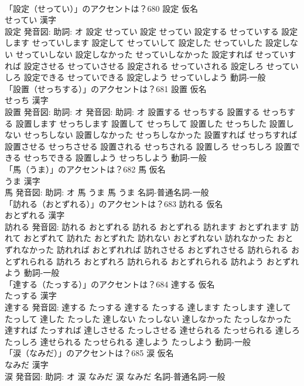 \documentclass[8pt]{extreport}
\begin{document}
\begin{CJK}{UTF8}{min}
\\	「設定（せってい）」のアクセントは？680	設定 仮名　
\\	せってい 漢字　
\\	設定 発音図: 助詞: オ	設定 せってい		設定 せってい 設定する せっていする 設定します せっていします 設定して せっていして 設定した せっていした 設定しない せっていしない 設定しなかった せっていしなかった 設定すれば せっていすれば 設定させる せっていさせる 設定される せっていされる 設定しろ せっていしろ 設定できる せっていできる 設定しよう せっていしよう				動詞-一般 
\\	「設置（せっちする）」のアクセントは？681	設置 仮名　
\\	せっち 漢字　
\\	設置 発音図: 助詞: オ 発音図: 助詞: オ	設置する せっちする		設置する せっちする 設置します せっちします 設置して せっちして 設置した せっちした 設置しない せっちしない 設置しなかった せっちしなかった 設置すれば せっちすれば 設置させる せっちさせる 設置される せっちされる 設置しろ せっちしろ 設置できる せっちできる 設置しよう せっちしよう				動詞-一般 
\\	「馬（うま）」のアクセントは？682	馬 仮名　
\\	うま 漢字　
\\	馬 発音図: 助詞: オ	馬 うま		馬 うま				名詞-普通名詞-一般 
\\	「訪れる（おとずれる）」のアクセントは？683	訪れる 仮名　
\\	おとずれる 漢字　
\\	訪れる 発音図:	訪れる おとずれる		訪れる おとずれる 訪れます おとずれます 訪れて おとずれて 訪れた おとずれた 訪れない おとずれない 訪れなかった おとずれなかった 訪れれば おとずれれば 訪れさせる おとずれさせる 訪れられる おとずれられる 訪れろ おとずれろ 訪れられる おとずれられる 訪れよう おとずれよう				動詞-一般 
\\	「達する（たっする）」のアクセントは？684	達する 仮名　
\\	たっする 漢字　
\\	達する 発音図:	達する たっする		達する たっする 達します たっします 達して たっして 達した たっした 達しない たっしない 達しなかった たっしなかった 達すれば たっすれば 達しさせる たっしさせる 達せられる たっせられる 達しろ たっしろ 達せられる たっせられる 達しよう たっしよう				動詞-一般 
\\	「涙（なみだ）」のアクセントは？685	涙 仮名　
\\	なみだ 漢字　
\\	涙 発音図: 助詞: オ	涙 なみだ		涙 なみだ				名詞-普通名詞-一般 

\end{CJK}
\end{document}
